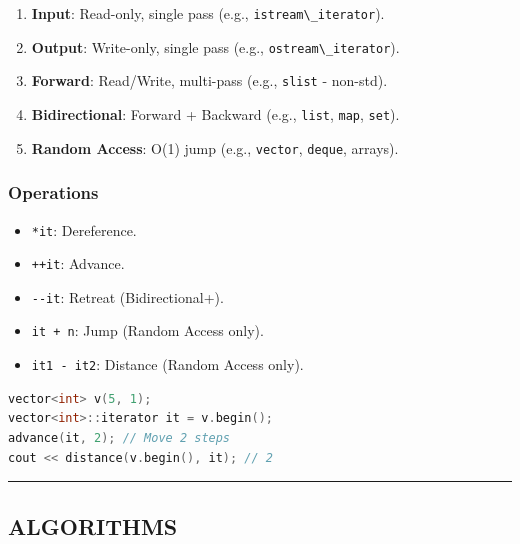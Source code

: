 \begin{enumerate}
\def\labelenumi{\arabic{enumi}.}
\tightlist
\item
  \textbf{Input}: Read-only, single pass (e.g.,
  \passthrough{\lstinline!istream\_iterator!}).
\item
  \textbf{Output}: Write-only, single pass (e.g.,
  \passthrough{\lstinline!ostream\_iterator!}).
\item
  \textbf{Forward}: Read/Write, multi-pass (e.g.,
  \passthrough{\lstinline!slist!} - non-std).
\item
  \textbf{Bidirectional}: Forward + Backward (e.g.,
  \passthrough{\lstinline!list!}, \passthrough{\lstinline!map!},
  \passthrough{\lstinline!set!}).
\item
  \textbf{Random Access}: O(1) jump (e.g.,
  \passthrough{\lstinline!vector!}, \passthrough{\lstinline!deque!},
  arrays).
\end{enumerate}

\hypertarget{operations}{%
\subsubsection{Operations}\label{operations}}

\begin{itemize}
\tightlist
\item
  \passthrough{\lstinline!*it!}: Dereference.
\item
  \passthrough{\lstinline!++it!}: Advance.
\item
  \passthrough{\lstinline!--it!}: Retreat (Bidirectional+).
\item
  \passthrough{\lstinline!it + n!}: Jump (Random Access only).
\item
  \passthrough{\lstinline!it1 - it2!}: Distance (Random Access only).
\end{itemize}

\begin{lstlisting}[language={C++}]
vector<int> v(5, 1);
vector<int>::iterator it = v.begin();
advance(it, 2); // Move 2 steps
cout << distance(v.begin(), it); // 2
\end{lstlisting}

\begin{center}\rule{0.5\linewidth}{0.5pt}\end{center}

\hypertarget{algorithms}{%
\subsection{ALGORITHMS}\label{algorithms}}

